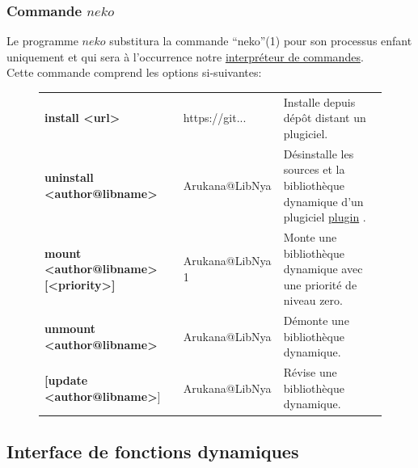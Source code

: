 \documentclass{report}
\newcommand{\program}{\textit{neko}}
\begin{document}

\subsubsection{Commande $\program$ }

Le programme $\program$ substitura la commande \enquote{neko}(1) pour son processus enfant uniquement et qui sera à l'occurrence notre \href{https://fr.wikipedia.org/wiki/Interpr%C3%A9teur_de_commandes}{interpréteur de commandes}. \\

Cette commande comprend les options si-suivantes: \\

\begin{figure}[!ht]
    \begin{minipage}{\textwidth}
    \centering
		\begin{tabular}{p{}p{}p{}}
			\textbf{install <url>} & https://git... & Installe depuis dépôt distant un plugiciel. \\
			\textbf{uninstall <author@libname>} & Arukana@LibNya & Désinstalle les sources et la bibliothèque dynamique d'un plugiciel \textendash{} \href{https://fr.wikipedia.org/wiki/Plugin}{plugin} \textendash{}. \\
			\textbf{mount <author@libname> [<priority>]} & Arukana@LibNya 1 & Monte une bibliothèque dynamique avec une priorité de niveau zero. \\
			\textbf{unmount <author@libname>} & Arukana@LibNya & Démonte une bibliothèque dynamique. \\
			\textbf[\textbf{update <author@libname>}] & Arukana@LibNya & Révise une bibliothèque dynamique. \\
		\end{tabular}
    \end{minipage}
\end{figure}

\subsection{Interface de fonctions dynamiques \textendash{}}
\end{document}
